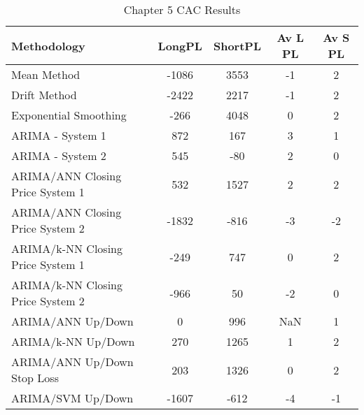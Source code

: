 \begin{table}[ht]
\centering
\caption[Chapter 5 CAC Results]{Chapter 5 CAC Results} 
\label{tab:chp6:cac2_summary}
\begin{tabular}{lcccc}
  \toprule Methodology & LongPL & ShortPL & Av L PL & Av S PL \\ 
  \midrule Mean Method & -1086 & 3553 & -1 & 2 \\ 
  Drift Method & -2422 & 2217 & -1 & 2 \\ 
  Exponential Smoothing & -266 & 4048 & 0 & 2 \\ 
  ARIMA - System 1 & 872 & 167 & 3 & 1 \\ 
  ARIMA - System 2 & 545 & -80 & 2 & 0 \\ 
  ARIMA/ANN Closing Price System 1 & 532 & 1527 & 2 & 2 \\ 
  ARIMA/ANN Closing Price System 2 & -1832 & -816 & -3 & -2 \\ 
  ARIMA/k-NN Closing Price System 1 & -249 & 747 & 0 & 2 \\ 
  ARIMA/k-NN Closing Price System 2 & -966 & 50 & -2 & 0 \\ 
  ARIMA/ANN Up/Down & 0 & 996 & NaN & 1 \\ 
  ARIMA/k-NN Up/Down & 270 & 1265 & 1 & 2 \\ 
  ARIMA/ANN Up/Down Stop Loss & 203 & 1326 & 0 & 2 \\ 
  ARIMA/SVM Up/Down & -1607 & -612 & -4 & -1 \\ 
   \bottomrule \end{tabular}
\end{table}
